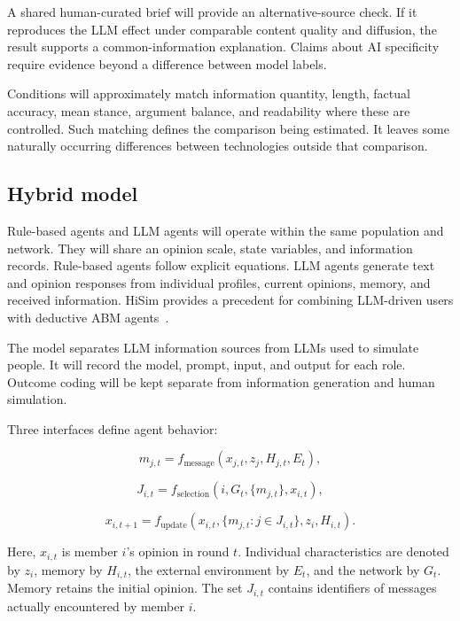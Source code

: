 \documentclass[11pt,a4paper]{article}
\begin{document}
A shared human-curated brief will provide an alternative-source check. If it reproduces the LLM effect under comparable content quality and diffusion, the result supports a common-information explanation. Claims about AI specificity require evidence beyond a difference between model labels.

Conditions will approximately match information quantity, length, factual accuracy, mean stance, argument balance, and readability where these are controlled. Such matching defines the comparison being estimated. It leaves some naturally occurring differences between technologies outside that comparison.

\subsection{Hybrid model}

Rule-based agents and LLM agents will operate within the same population and network. They will share an opinion scale, state variables, and information records. Rule-based agents follow explicit equations. LLM agents generate text and opinion responses from individual profiles, current opinions, memory, and received information. HiSim provides a precedent for combining LLM-driven users with deductive ABM agents~\citep{mou2024}.

The model separates LLM information sources from LLMs used to simulate people. It will record the model, prompt, input, and output for each role. Outcome coding will be kept separate from information generation and human simulation.

Three interfaces define agent behavior:

\begin{equation*}
m_{j,t}=f_{\text{message}}(x_{j,t},z_j,H_{j,t},E_t),
\end{equation*}

\begin{equation*}
J_{i,t}=f_{\text{selection}}(i,G_t,\{m_{j,t}\},x_{i,t}),
\end{equation*}

\begin{equation*}
x_{i,t+1}=f_{\text{update}}
\left(x_{i,t},\{m_{j,t}:j\in J_{i,t}\},z_i,H_{i,t}\right).
\end{equation*}

Here, $x_{i,t}$ is member $i$'s opinion in round $t$. Individual characteristics are denoted by $z_i$, memory by $H_{i,t}$, the external environment by $E_t$, and the network by $G_t$. Memory retains the initial opinion. The set $J_{i,t}$ contains identifiers of messages actually encountered by member $i$.
\end{document}
